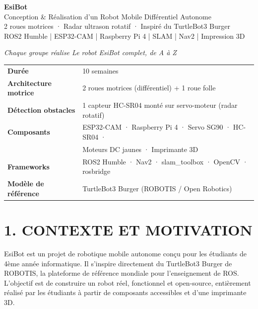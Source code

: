 \documentclass[12pt,a4paper]{article}
\begin{document}
\begin{center}
  {\LARGE\bfseries EsiBot}\\[6pt]
  {\large Conception \& Réalisation d'un Robot Mobile Différentiel Autonome}\\[10pt]
  {\normalsize
    2 roues motrices · Radar ultrason rotatif · Inspiré du TurtleBot3 Burger\\[4pt]
    ROS2 Humble | ESP32-CAM | Raspberry Pi 4 | SLAM | Nav2 | Impression 3D
  }
\end{center}

\vspace{8pt}

\begin{center}
{\itshape Chaque groupe réalise Le robot EsiBot complet, de A à Z}
\end{center}

\vspace{6pt}

\begin{center}
\begin{tabular}{ll}
\textbf{Durée}              & 10 semaines \\
\textbf{Architecture motrice} & 2 roues motrices (différentiel) + 1 roue folle \\
\textbf{Détection obstacles} & 1 capteur HC-SR04 monté sur servo-moteur (radar rotatif) \\
\textbf{Composants}         & ESP32-CAM · Raspberry Pi 4 · Servo SG90 · HC-SR04 · \\
                             & Moteurs DC jaunes · Imprimante 3D \\
\textbf{Frameworks}         & ROS2 Humble · Nav2 · slam\_toolbox · OpenCV · rosbridge \\
\textbf{Modèle de référence} & TurtleBot3 Burger (ROBOTIS / Open Robotics) \\
\end{tabular}
\end{center}

\section{1. CONTEXTE ET MOTIVATION}

EsiBot est un projet de robotique mobile autonome conçu pour les étudiants de 4ème année informatique. Il s'inspire directement du TurtleBot3 Burger de ROBOTIS, la plateforme de référence mondiale pour l'enseignement de ROS. L'objectif est de construire un robot réel, fonctionnel et open-source, entièrement réalisé par les étudiants à partir de composants accessibles et d'une imprimante 3D.
\end{document}
